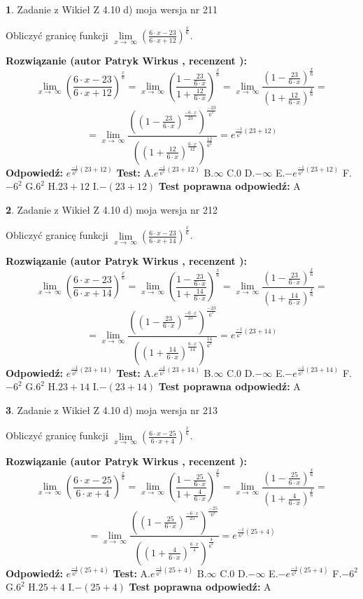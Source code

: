 \documentclass[12pt, a4paper]{article}
\theoremstyle{definition} %
\newtheorem{zad}{}
\newcommand{\zadStart}[1]{\begin{zad}#1\newline}
\newcommand{\zadStop}{\end{zad}}
\newcommand{\rozwStart}[2]{\noindent \textbf{Rozwiązanie (autor #1 , recenzent #2): }\newline}
\newcommand{\rozwStop}{\newline}
\newcommand{\odpStart}{\noindent \textbf{Odpowiedź:}\newline}
\newcommand{\odpStop}{\newline}
\newcommand{\testStart}{\noindent \textbf{Test:}\newline}
\newcommand{\testStop}{\newline}
\newcommand{\kluczStart}{\noindent \textbf{Test poprawna odpowiedź:}\newline}
\newcommand{\kluczStop}{\newline}
\begin{document}
\zadStart{Zadanie z Wikieł Z 4.10 d) moja wersja nr 211}


Obliczyć granicę funkcji  $\lim\limits_{x\to\ \infty}(\frac{6\cdot x-23}{6\cdot x+12})^{\frac{x}{6}}$.
\zadStop
\rozwStart{Patryk Wirkus}{}
$$\lim\limits_{x\to\ \infty}(\frac{6\cdot x-23}{6\cdot x+12})^{\frac{x}{6}} = \lim\limits_{x\to\ \infty}(\frac{1-\frac{23}{6\cdot x}}{1+\frac{12}{6\cdot x}})^{\frac{x}{6}}=\lim\limits_{x\to\ \infty}\frac{(1-\frac{23}{6\cdot x})^{\frac{x}{6}}}{(1+\frac{12}{6\cdot x})^{\frac{x}{6}}}=$$
$$=\lim\limits_{x\to\ \infty}\frac{((1-\frac{23}{6\cdot x})^{\frac{-6\cdot x}{23}})^{\frac{-23}{6^{2}}}}{((1+\frac{12}{6\cdot x})^{\frac{6\cdot x}{12}})^{\frac{12}{6^{2}}}}=e^{\frac{-1}{6^{2}}(23+12)}$$
\rozwStop
\odpStart
$e^{\frac{-1}{6^{2}}(23+12)}$
\odpStop
\testStart
A.$e^{\frac{-1}{6^{2}}(23+12)}$ B.$\infty$ C.$0$ D.$-\infty$ E.$-e^{\frac{-1}{6^{2}}(23+12)}$
F.$-6^{2}$ G.$6^{2}$
H.$23+12$
I.$-(23+12)$
\testStop
\kluczStart
A
\kluczStop



\zadStart{Zadanie z Wikieł Z 4.10 d) moja wersja nr 212}


Obliczyć granicę funkcji  $\lim\limits_{x\to\ \infty}(\frac{6\cdot x-23}{6\cdot x+14})^{\frac{x}{6}}$.
\zadStop
\rozwStart{Patryk Wirkus}{}
$$\lim\limits_{x\to\ \infty}(\frac{6\cdot x-23}{6\cdot x+14})^{\frac{x}{6}} = \lim\limits_{x\to\ \infty}(\frac{1-\frac{23}{6\cdot x}}{1+\frac{14}{6\cdot x}})^{\frac{x}{6}}=\lim\limits_{x\to\ \infty}\frac{(1-\frac{23}{6\cdot x})^{\frac{x}{6}}}{(1+\frac{14}{6\cdot x})^{\frac{x}{6}}}=$$
$$=\lim\limits_{x\to\ \infty}\frac{((1-\frac{23}{6\cdot x})^{\frac{-6\cdot x}{23}})^{\frac{-23}{6^{2}}}}{((1+\frac{14}{6\cdot x})^{\frac{6\cdot x}{14}})^{\frac{14}{6^{2}}}}=e^{\frac{-1}{6^{2}}(23+14)}$$
\rozwStop
\odpStart
$e^{\frac{-1}{6^{2}}(23+14)}$
\odpStop
\testStart
A.$e^{\frac{-1}{6^{2}}(23+14)}$ B.$\infty$ C.$0$ D.$-\infty$ E.$-e^{\frac{-1}{6^{2}}(23+14)}$
F.$-6^{2}$ G.$6^{2}$
H.$23+14$
I.$-(23+14)$
\testStop
\kluczStart
A
\kluczStop



\zadStart{Zadanie z Wikieł Z 4.10 d) moja wersja nr 213}


Obliczyć granicę funkcji  $\lim\limits_{x\to\ \infty}(\frac{6\cdot x-25}{6\cdot x+4})^{\frac{x}{6}}$.
\zadStop
\rozwStart{Patryk Wirkus}{}
$$\lim\limits_{x\to\ \infty}(\frac{6\cdot x-25}{6\cdot x+4})^{\frac{x}{6}} = \lim\limits_{x\to\ \infty}(\frac{1-\frac{25}{6\cdot x}}{1+\frac{4}{6\cdot x}})^{\frac{x}{6}}=\lim\limits_{x\to\ \infty}\frac{(1-\frac{25}{6\cdot x})^{\frac{x}{6}}}{(1+\frac{4}{6\cdot x})^{\frac{x}{6}}}=$$
$$=\lim\limits_{x\to\ \infty}\frac{((1-\frac{25}{6\cdot x})^{\frac{-6\cdot x}{25}})^{\frac{-25}{6^{2}}}}{((1+\frac{4}{6\cdot x})^{\frac{6\cdot x}{4}})^{\frac{4}{6^{2}}}}=e^{\frac{-1}{6^{2}}(25+4)}$$
\rozwStop
\odpStart
$e^{\frac{-1}{6^{2}}(25+4)}$
\odpStop
\testStart
A.$e^{\frac{-1}{6^{2}}(25+4)}$ B.$\infty$ C.$0$ D.$-\infty$ E.$-e^{\frac{-1}{6^{2}}(25+4)}$
F.$-6^{2}$ G.$6^{2}$
H.$25+4$
I.$-(25+4)$
\testStop
\kluczStart
A
\kluczStop
\end{document}
